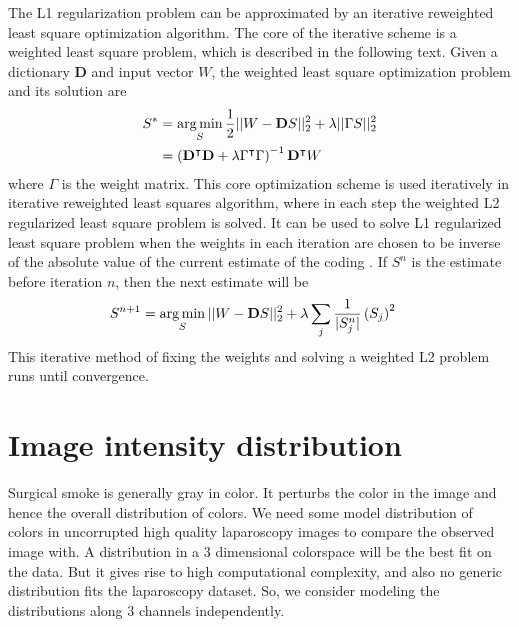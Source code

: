The L1 regularization problem can be approximated by an iterative reweighted least square optimization algorithm. The core of the iterative scheme is a weighted least square problem, which is described in the following text. Given a dictionary $\mathbf{D}$ and input vector $W$, the weighted least square optimization problem and its solution are
\begin{align}
    S^* &= \operatorname*{arg\,min}_{S} \frac{1}{2} || W - \mathbf{D} S ||_2^2 + \lambda || \Gamma S ||_2^2 \label{eqn:wls}\\
    &= \left( \mathbf{D}^\intercal \mathbf{D} + \lambda \Gamma^\intercal \Gamma \right)^{-1} \mathbf{D}^\intercal W \label{eqn:wlsSolution}
\end{align}
where $\Gamma$ is the weight matrix. This core optimization scheme is used iteratively in iterative reweighted least squares algorithm, where in each step the weighted L2 regularized least square problem is solved. It can be used to solve L1 regularized least square problem when the weights in each iteration are chosen to be inverse of the absolute value of the current estimate of the coding \cite{chartrand2008iteratively}. If $S^n$ is the estimate before iteration $n$, then the next estimate will be
\begin{align}
    S^{n+1} &= \operatorname*{arg\,min}_{S} || W - \mathbf{D} S ||_2^2 + \lambda \sum_{j} \frac{1}{| S_j^n |} \left( S_j \right)^2 \label{eqn:irls_l1} 
\end{align}
This iterative method of fixing the weights and solving a weighted L2 problem runs until convergence.



\section{Image intensity distribution}
\label{sec:pcaDist}
Surgical smoke is generally gray in color. It perturbs the color in the image and hence the overall distribution of colors. We need some model distribution of colors in uncorrupted high quality laparoscopy images to compare the observed image with. A distribution in a 3 dimensional colorspace will be the best fit on the data. But it gives rise to high computational complexity, and also no generic distribution fits the laparoscopy dataset. So, we consider modeling the distributions along 3 channels independently.


